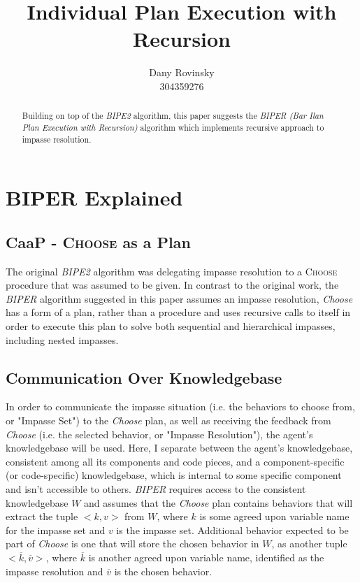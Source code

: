 \documentclass[3p,times]{elsarticle} %
\newcommand{\noun}[1]{\textsc{#1}}
\begin{document}
\begin{frontmatter}
\title{Individual Plan Execution with Recursion}
\author{Dany Rovinsky\\304359276}
\address{Computer Science Department\\
Bar Ilan University, Israel}

\begin{abstract}
Building on top of the \textit{BIPE2} algorithm, this paper suggests the \textit{BIPER (Bar Ilan Plan Execution with Recursion)} algorithm which implements recursive approach to impasse resolution.
\end{abstract}

\end{frontmatter}

\section{BIPER Explained}

\subsection{CaaP - \noun{Choose} as a Plan}

The original \textit{BIPE2} algorithm was delegating impasse resolution to a \noun{Choose} procedure that was assumed to be given. In contrast to the original work, the \textit{BIPER} algorithm suggested in this paper assumes an impasse resolution, \textit{Choose} has a form of a plan, rather than a procedure and uses recursive calls to itself in order to execute this plan to solve both sequential and hierarchical impasses, including nested impasses.

\subsection{Communication Over  Knowledgebase}

In order to communicate the impasse situation (i.e. the behaviors to choose from, or "Impasse Set") to the \textit{Choose} plan, as well as receiving the feedback from \textit{Choose} (i.e. the selected behavior, or "Impasse Resolution"), the agent's knowledgebase will be used. Here, I separate between the agent's knowledgebase, consistent among all its components and code pieces, and a component-specific (or code-specific) knowledgebase, which is internal to some specific component and isn't accessible to others. \textit{BIPER} requires access to the consistent knowledgebase $W$ and assumes that the \textit{Choose} plan contains behaviors that will extract the tuple $<k,v>$ from $W$, where $k$ is some agreed upon variable name for the impasse set and $v$ is the impasse set. Additional behavior expected to be part of \textit{Choose} is one that will store the chosen behavior in $W$, as another tuple $<\overline{k},\overline{v}>$, where $\overline{k}$ is another agreed upon variable name, identified as the impasse resolution and $\overline{v}$ is the chosen behavior.
\end{document}
